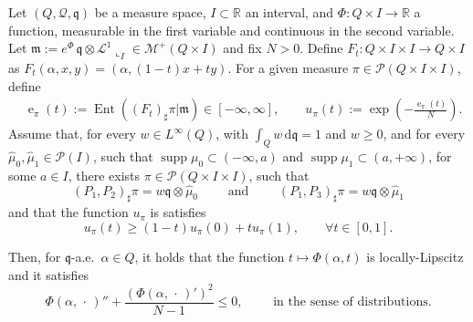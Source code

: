 \documentclass[10pt,a4paper]{amsart}
\DeclareMathOperator{\Ent}{Ent}
\DeclareMathOperator{\ee}{e}
\DeclareMathOperator{\supp}{supp}
\newcommand{\M}{\mathcal{M}}
\newcommand{\Prob}{\mathcal P}
\newcommand{\R}{\mathbb{R}}
\newcommand{\de}{{\mathrm{d}}}
\newcommand{\dotargument}{\,\cdot\,}
\newcommand{\mm}{\mathfrak m}
\newcommand{\qq}{\mathfrak q}
\newcommand{\q}{\mathfrak{q}}
\renewcommand{\L}{\mathcal{L}}
\begin{document}
\begin{lemma}
\label{lem:wasserstein-mixture}
Let $(Q,\mathcal{Q},\q)$ be a measure space, $I\subset \R$ an 
interval, and
$\Phi:Q\times I\to \R$ a function, measurable in the first
variable and continuous in the second variable.
%
Let 
$\mm:=e^{\Phi}\,\q\otimes\L^1\llcorner_{I}\in\M^{+}(Q\times
  I)$ and fix $N>0$. 
  Define $F_t:Q\times I\times I\to Q\times I$ as
  $F_t(\alpha,x,y)=(\alpha,(1-t)x+t y)$.
  For a given measure $\pi\in\Prob(Q\times I\times I)$, define
  \begin{align*}
    &
      \ee_\pi(t)
      :=
      \Ent((F_t)_{\sharp}\pi|\mm)
      \in[-\infty,\infty]
      ,
      \qquad
      u_\pi(t)
      :=
      \exp
      \left(
      -\frac{\ee_\pi(t)}{N}
      \right)
      .
  \end{align*}
  Assume that, for every $w\in L^\infty(Q)$, with $\int_Q w\,\de\q=1$ and
  $w\geq 0$,
  and for every $\hat \mu_0,\hat \mu_1\in\Prob(I)$, such that $\supp
  \mu_0\subset (-\infty,a)$ and $\supp \mu_1\subset (a,+\infty)$, for
  some $a\in I$,
  there exists
  $\pi\in\Prob(Q\times I\times I)$, such that
  \begin{equation}
    (P_1, P_2)_{\sharp}\pi
    =
    w\q\otimes\hat\mu_0
    \qquad
    \text{ and }
    \qquad
    (P_1, P_3)_{\sharp}\pi
    =
    w\q\otimes\hat\mu_1
  \end{equation}
  and that the function $u_\pi$ is satisfies
  \begin{equation}\label{E:convexitylemma}
    u_\pi(t)
    \geq
    (1-t)
    u_\pi(0)
    +
    t
    u_\pi(1)
    ,
    \qquad
    \forall t\in[0,1]
    .
  \end{equation}

Then, for $\qq$-a.e.\ $\alpha\in Q$, it holds that  the function $t\mapsto \Phi(\alpha,t)$ is locally-Lipscitz and it satisfies
\begin{equation}
    \label{eq:riccati-for-fibers}
\Phi(\alpha,\dotargument)''
    +
\frac{(\Phi(\alpha,\dotargument)')^2}{N-1}
    \leq
    0
    ,
    \qquad
    \text{ in the sense of distributions.}
\end{equation}
\end{lemma}
\end{document}
